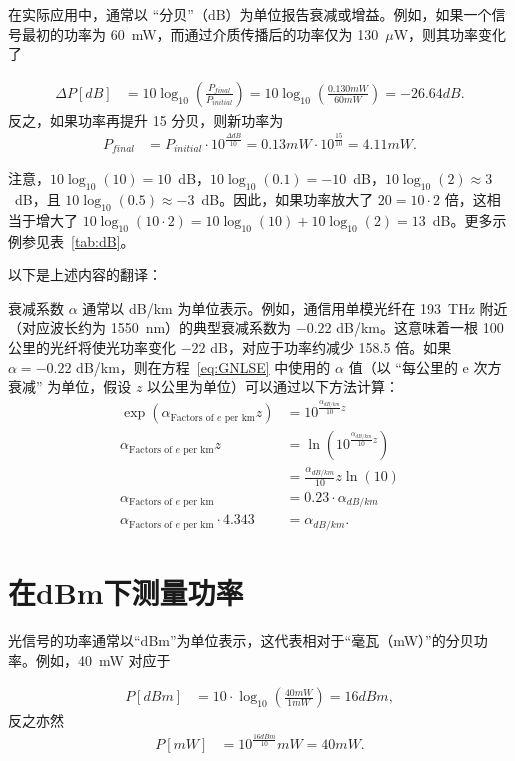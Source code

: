 在实际应用中，通常以 “分贝”（dB）为单位报告衰减或增益。例如，如果一个信号最初的功率为 60~mW，而通过介质传播后的功率仅为 130~$\mu$W，则其功率变化了

\begin{align}
    \Delta P [dB] &= 10 \log_{10}\left(\frac{P_{final}}{P_{initial}} \right)= 10 \log_{10}\left(\frac{0.130 mW}{60 mW} \right) = -26.64 dB.
\end{align}
反之，如果功率再提升 15 分贝，则新功率为
\begin{align}
\label{eq:boost}
    P_{final}&=P_{initial}\cdot10^{\frac{\Delta dB}{10}}=0.13mW\cdot10^{\frac{15}{10}} = 4.11 mW.
\end{align}


注意，$10\log_{10}(10)=10$~dB，$10\log_{10}(0.1)=-10$~dB，$10\log_{10}(2)\approx3$~dB，且 $10\log_{10}(0.5)\approx-3$~dB。因此，如果功率放大了 $20=10\cdot 2$ 倍，这相当于增大了 $10\log_{10}(10\cdot 2) = 10\log_{10}(10)+10\log_{10}(2) = 13$~dB。更多示例参见表~\ref{tab:dB}。

以下是上述内容的翻译：

衰减系数 $\alpha$ 通常以 dB/km 为单位表示。例如，通信用单模光纤在 193~THz 附近（对应波长约为 1550~nm）的典型衰减系数为 $-0.22$ dB/km。这意味着一根 100 公里的光纤将使光功率变化 $-22$ dB，对应于功率约减少 158.5 倍。如果 $\alpha=-0.22$ dB/km，则在方程~\ref{eq:GNLSE} 中使用的 $\alpha$ 值（以 “每公里的 e 次方衰减” 为单位，假设 $z$ 以公里为单位）可以通过以下方法计算：
\begin{align}
    \exp\left(\alpha_{\text{Factors of $e$ per km}}z\right) &= 10^{ \frac{\alpha_{dB/km}}{10}z} \\ \nonumber
    \alpha_{\text{Factors of $e$ per km}}z &= \ln\left(10^{ \frac{\alpha_{dB/km}}{10}z} \right)\\ \nonumber
    &= \frac{\alpha_{dB/km}}{10}z \ln(10)\\ \nonumber
    \alpha_{\text{Factors of $e$ per km}} &= 0.23\cdot \alpha_{dB/km}\\ \nonumber
    \alpha_{\text{Factors of $e$ per km}}\cdot4.343&=\alpha_{dB/km}.
\end{align}


\section{在dBm下测量功率}

光信号的功率通常以“dBm”为单位表示，这代表相对于“毫瓦（mW）”的分贝功率。例如，40~mW 对应于

\begin{align}
    P [dBm] &= 10\cdot\log_{10}\left(\frac{40mW}{1mW} \right)=16dBm,
\end{align}
反之亦然
\begin{align}
    \label{eq:dBm_rev}
    P [mW] &= 10^{\frac{16dBm}{10}}mW=40mW.
\end{align}

